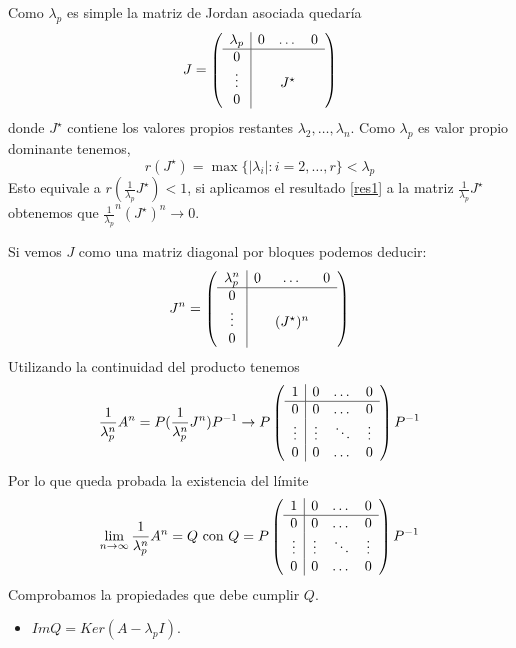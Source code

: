 \documentclass[size=a4, parskip=half, titlepage=false, toc=flat, toc=bib, 12pt]{scrartcl}
\makeatletter
\renewenvironment{proof}[1][\proofname] {\par\pushQED{\qed}\normalfont\topsep6\p@\@plus6\p@\relax\trivlist\item[\hskip\labelsep\itshape\sffamily#1\@addpunct{.}]\ignorespaces}{\popQED\endtrivlist\@endpefalse}
\theoremstyle{theorem-style}
\theoremstyle{definition-style}
\theoremstyle{remark-style}
\theoremstyle{example-style}
\theoremstyle{definition-style}
\theoremstyle{remark-style}
\makeatother
\begin{document}
\begin{proof}
Como $\lambda_p$ es simple la matriz de Jordan asociada quedaría $$
  J =
    \left(
      \begin{array}{{c|ccc}}
        \lambda_p     &    0      &   \dots    & 0\\\hline
            0         &           &        &  \\
            \vdots    &           & J^{\star} &  \\
           0          &           &        &
      \end{array}
    \right)
$$ donde $J^{\star}$ contiene los valores propios restantes $\lambda_2, \dots, \lambda_n$.
Como $\lambda_p$ es valor propio dominante tenemos,
$$r(J^{\star}) = \max \{ |\lambda_i| : i = 2, \dots , r \} < \lambda_p $$
Esto equivale a $r(\frac{1}{\lambda_p} J^{\star}) < 1$, si aplicamos el resultado \ref{res1} a la matriz $\frac{1}{\lambda_p} J^{\star}$ obtenemos que $\frac{1}{\lambda_p}^n (J^{\star})^n \rightarrow 0$.

Si vemos $J$ como una matriz diagonal por bloques podemos deducir:
$$J^n =      \left(
      \begin{array}{{c|ccc}}
        \lambda_p^n     &    0      &   \dots    & 0\\\hline
            0         &           &        &  \\
            \vdots    &           & (J^{\star})^n &  \\
           0          &           &        &
      \end{array}
    \right)$$
Utilizando la continuidad del producto tenemos
$$\frac{1}{\lambda_p^n} A^n = P (\frac{1}{\lambda_p^n}  J^n)P^{-1} \rightarrow P \left(
      \begin{array}{{c|ccc}}
            1         &    0      &   \dots    & 0\\\hline
            0         &    0       &    \dots    & 0 \\
            \vdots    &    \vdots  &  \ddots &  \vdots \\
           0          &     0       &    \dots    & 0
      \end{array}   \right) P^{-1}$$
Por lo que queda probada la existencia del límite
$$\lim_{n \to \infty} \frac{1}{\lambda_p^n} A^n  = Q \  \textrm{con} \ Q = P \left(
      \begin{array}{{c|ccc}}
            1         &    0      &   \dots    & 0\\\hline
            0         &    0       &    \dots    & 0 \\
            \vdots    &    \vdots  &  \ddots &  \vdots \\
           0          &     0       &    \dots    & 0
      \end{array}   \right) P^{-1} $$
Comprobamos la propiedades que debe cumplir $Q$.
\begin{itemize}
\item $Im Q = Ker (A - \lambda_p I)$.


\end{itemize}
\end{proof}
\end{document}
